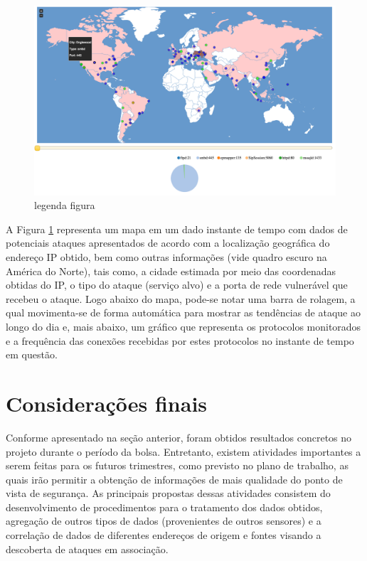 \documentclass[%
        Portuguese,%
        ]
{ic-tese-v2}
\begin{document}
\begin{figure}
\center
\includegraphics[width=1\textwidth]{figs/mapa.png}
\caption{legenda figura}
\label{mapa}
\end{figure}


A Figura \ref{mapa} representa um mapa em um dado instante de tempo com dados de potenciais ataques apresentados de acordo com a localização geográfica do endereço IP obtido, bem como outras informações (vide quadro escuro na América do Norte), tais como, a cidade estimada por meio das coordenadas obtidas do IP, o tipo do ataque (serviço alvo) e a porta de rede vulnerável que recebeu o ataque. Logo abaixo do mapa, pode-se notar uma barra de rolagem, a qual movimenta-se de forma automática para mostrar as tendências de ataque ao longo do dia e, mais abaixo, um gráfico que representa os protocolos monitorados e a frequência das conexões recebidas por estes protocolos no instante de tempo em questão.


\chapter{Considerações finais}
Conforme apresentado na seção anterior, foram obtidos resultados concretos no projeto durante o período da bolsa. Entretanto, existem atividades importantes a serem feitas para os futuros trimestres, como previsto no plano de trabalho, as quais irão permitir a obtenção de informações de mais qualidade do ponto de vista de segurança. As principais propostas dessas atividades consistem do desenvolvimento de procedimentos para o tratamento dos dados obtidos, agregação de outros tipos de dados (provenientes de outros sensores) e a correlação de dados de diferentes endereços de origem e fontes visando a descoberta de ataques em associação.
\end{document}
